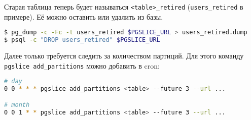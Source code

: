 Старая таблица теперь будет называться \lstinline!<table>_retired! (\lstinline!users_retired! в примере). Её можно оставить или удалить из базы.

\begin{lstlisting}[language=Bash,label=lst:pgslice9,caption=Удаление старой таблицы]
$ pg_dump -c -Fc -t users_retired $PGSLICE_URL > users_retired.dump
$ psql -c "DROP users_retired" $PGSLICE_URL
\end{lstlisting}

Далее только требуется следить за количеством партиций. Для этого команду \lstinline!pgslice add_partitions! можно добавить в cron:

\begin{lstlisting}[language=Bash,label=lst:pgslice10,caption=Cron]
# day
0 0 * * * pgslice add_partitions <table> --future 3 --url ...

# month
0 0 1 * * pgslice add_partitions <table> --future 3 --url ...
\end{lstlisting}
